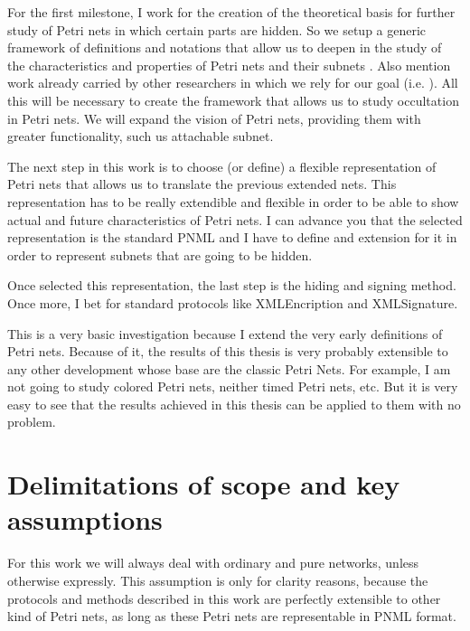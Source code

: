 For the first milestone, I work for the creation
of the theoretical basis for further study of Petri nets
in which certain parts are hidden. So we setup
a generic framework of definitions and notations that allow us to deepen
in the study of the characteristics and properties of Petri nets and their
subnets \citep{G-Murata1989541,G-Silva1985}.
Also mention work already carried
by other researchers in which we rely for
our goal (i.e. \citep{SM-Silva19931,EPN-David2010,EPN-Jensen2009,G-EPN-Peterson1981}). All this will be necessary to create the framework that allows us to study occultation in Petri nets. We will expand the vision of Petri nets, providing them with greater functionality,
such us attachable subnet.

The next step in this work is to choose (or define) a flexible representation of Petri
nets that allows us to translate the previous extended nets. This representation has to be really extendible and flexible in order to be able to show actual and future characteristics of Petri nets.
I can advance you that the selected representation is the standard PNML and I have to define and extension for it in order to represent subnets that are going to
be hidden.

Once selected this representation, the last step is the hiding and signing method. Once
more, I bet for standard protocols like XMLEncription and XMLSignature.

This is a very basic investigation because I extend the very early
definitions of Petri nets. Because of it, the results of this thesis is very probably extensible to any other development whose base are the classic Petri Nets. For example, I am not going to study colored Petri nets, neither timed
Petri nets, etc. But it is very easy to see that the results achieved in
this thesis can be applied to them with no problem.  

\section{Delimitations of scope and key assumptions}  
For this work we will always deal with ordinary and pure networks, unless otherwise expressly. This assumption is only for clarity reasons, because
the protocols and methods described in this work are perfectly extensible
to other kind of Petri nets, as long as these Petri nets are representable
in PNML format.





